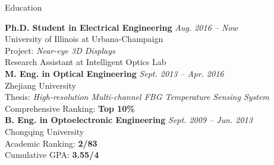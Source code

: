 \documentclass{resume} %
\begin{document}
	
	
	\begin{rSection}{Education}
		
		{\bf Ph.D. Student in Electrical Engineering} \hfill {\em Aug. 2016 -- Now} \\ 
		University of Illinois at Urbana-Champaign\\
		Project: \textit{Near-eye 3D Displays}\\
		Research Assistant at Intelligent Optics Lab\\
		
		{\bf M. Eng. in Optical Engineering} \hfill {\em Sept. 2013 -- Apr. 2016} \\ 
		Zhejiang University \\
		Thesis: \textit{High-resolution Multi-channel FBG Temperature Sensing System}\\
		Comprehensive Ranking: \textbf{Top 10\%} \\
		
		{\bf B. Eng. in Optoelectronic Engineering} \hfill {\em Sept. 2009 -- Jun. 2013} \\ 
		Chongqing University \\
		Academic Ranking: \textbf{2/83}\\
		Cumulative GPA: \textbf{3.55/4}\\
		
	\end{rSection}
	
	
\end{document}

